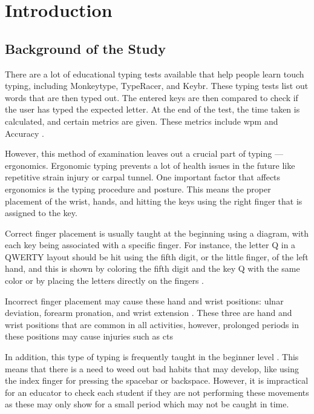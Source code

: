 \documentclass{report}
\begin{document}
\newpage

\printacronyms{}
\newpage

\listoftables
\newpage

\listoffigures
\newpage


\tableofcontents
\newpage


\chapter{Introduction}


\section{Background of the Study}
There are a lot of educational typing tests available that help people learn
touch typing, including Monkeytype, TypeRacer, and Keybr. These typing tests
list out words that are then typed out. The entered keys are then compared to
check if the user has typed the expected letter. At the end of the test, the
time taken is calculated, and certain metrics are given. These metrics include
\ac{wpm} and Accuracy \parencite{bartnik2021}.

However, this method of examination leaves out a crucial part of typing —
ergonomics. Ergonomic typing prevents a lot of health issues in the future like
repetitive strain injury or carpal tunnel. One important factor that affects
ergonomics is the typing procedure and posture. This means the proper placement of
the wrist, hands, and hitting the keys using the right finger that is assigned
to the key.

Correct finger placement is usually taught at the beginning using a diagram,
with each key being associated with a specific finger. For instance, the letter
Q in a QWERTY layout should be hit using the fifth digit, or the little finger,
of the left hand, and this is shown by coloring the fifth digit and the key Q
with the same color or by placing the letters directly on the fingers
\parencite{dobson2009touch}.

Incorrect finger placement may cause these hand and wrist positions: ulnar
deviation, forearm pronation, and wrist extension \parencite{serina1999}. These
three are hand and wrist positions that are common in all activities, however,
prolonged periods in these positions may cause injuries such as \ac{cts}
\parencite{toosi2015}

In addition, this type of typing is frequently taught in the beginner level
\parencite{donica2018}. This means that there is a need to weed out bad habits
that may develop, like using the index finger for pressing the spacebar or
backspace. However, it is impractical for an educator to check each student if
they are not performing these movements as these may only show for a small
period which may not be caught in time.
\end{document}
